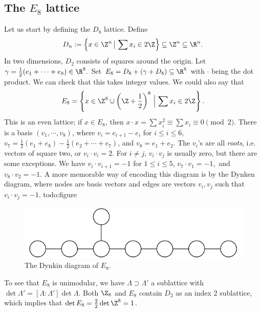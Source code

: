 \subsection{The $E_8$ lattice}
Let us start by defining the $D_8$ lattice. Define \[
D_n  := \left\{x \in \Z^n  \,\big|\, \sum x_i  \in 2\Z\right\}  \subseteq \Z^n \subseteq \R^n .
\] In two dimensions, $D_2$ consists of squares around the origin. Let $\gamma = \frac{1}{2}(e_1 + \cdots + e_8) \in \R^8.$ Set $E_8 = D_8+(\gamma +D_8) \subseteq \R^8$ with $\cdot $ being the dot product. We can check that this takes integer values. We could also say that \[
E_8= \left\{ x \in \Z^8 \cup  \left(\Z + \frac{1}{2}\right)^8 \,\Big|\, \sum x_i  \in 2\Z\right\} .
\] This is an even lattice; if $x \in E_8$, then $x \cdot x=\sum x_i  ^2 \equiv \sum x_i \equiv 0\pmod 2$. There is a basis $(v_1,\cdots ,v_8)$, where $v_i =e_{i+1}-e_i $ for $i \leq i \leq 6$, $v_7=\frac{1}{2}(e_1+e_8)- \frac{1}{2}(e_2 + \cdots +e_7)$, and $v_8= e_1+e_2$. The $v_i $'s are all \emph{roots}, i.e. vectors of square two, or $v_i  \cdot v_i =2$. For $i\neq j$, $v_i \cdot v_j $ is usually zero, but there are some exceptions. We have  $v_i  \cdot  v_{i+1}= -1$ for $1 \leq i \leq 5$, $v_7 \cdot  v_1 = -1, $ and $v_8 \cdot  v_2=-1$.  A more memorable way of encoding this diagram is by the Dynken diagram, where nodes are basis vectors and edges are vectors $v_i,v_j $ such that $v_i  \cdot v_j =-1$.
{\color{red}todo:figure} 
\begin{figure}[H]
\centering
 \includegraphics[width=0.6\linewidth]{figures/e8.png}
 \caption{The Dynkin diagram of $E_8$.} 
 \label{e8} 
\end{figure}

To see that $E_8$ is unimodular, we have $\Lambda \supset \Lambda'$ a sublattice with $\det \Lambda' = [\Lambda : \Lambda'] \det \Lambda$. Both $\Z_8$ and $E_8$ contain $D_2$ as an index 2 sublattice, which implies that $\det E_8= \frac{2}{2}\det \Z^8 =1$.

